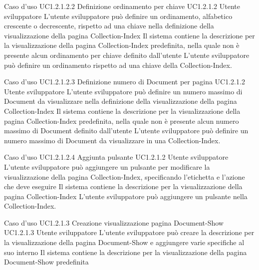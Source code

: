 \UCtitle
{Caso d'uso UC1.2.1.2.2}
{Definizione ordinamento per chiave}
\UC
{UC1.2.1.2}
{Utente sviluppatore}
{L'utente sviluppatore  può  definire un ordinamento, alfabetico crescente o decrescente, rispetto ad una chiave nella definizione della visualizzazione della pagina Collection-Index}
{Il sistema contiene la descrizione per la visualizzazione della pagina Collection-Index predefinita, nella quale non è presente alcun ordinamento per chiave definito dall'utente}
\scenario
{L'utente sviluppatore può definire un ordinamento rispetto ad una chiave della Collection-Index.}

\UCtitle
{Caso d'uso UC1.2.1.2.3}
{Definizione numero di Document per pagina}
\UC
{UC1.2.1.2}
{Utente sviluppatore}
{L'utente sviluppatore  può definire un numero massimo di Document da visualizzare nella definizione della visualizzazione della pagina Collection-Index}
{Il sistema contiene la descrizione per la visualizzazione della pagina Collection-Index predefinita, nella quale non è presente alcun numero massimo di Document definito dall'utente}
\scenario
{L'utente sviluppatore può definire un numero massimo di Document da visualizzare in una Collection-Index.}

\UCtitle
{Caso d'uso UC1.2.1.2.4}
{Aggiunta pulsante}
\UC
{UC1.2.1.2}
{Utente sviluppatore}
{L'utente sviluppatore può aggiungere un pulsante per modificare la visualizzazione della pagina Collection-Index, specificando l'etichetta e l'azione che deve eseguire}
{Il sistema contiene la descrizione per la visualizzazione della pagina Collection-Index}
\scenario
{L'utente sviluppatore può aggiungere un pulsante nella Collection-Index.}


\UCtitle
{Caso d'uso UC1.2.1.3}
{Creazione visualizzazione pagina Document-Show}
\UC
{UC1.2.1.3}
{Utente sviluppatore}
{L'utente sviluppatore  può creare la descrizione per la visualizzazione della pagina Document-Show e aggiungere varie specifiche al suo interno}
{Il sistema contiene la descrizione per la visualizzazione della pagina Document-Show predefinita}


